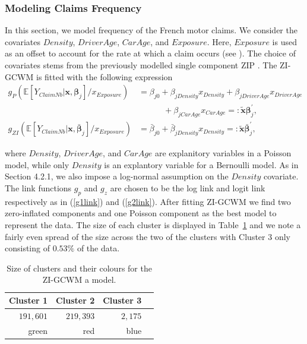 \documentclass[12pt,letterpaper]{article}
\numberwithin{equation}{section}
\numberwithin{equation}{section}
\numberwithin{equation}{section}
\newcommand{\xTilda}{\tilde{\bm{x}}}
\begin{document}
 \subsubsection{Modeling Claims Frequency}

In this section, we model frequency of the French motor claims. We consider the covariates $Density$, $DriverAge$, $CarAge$, and $Exposure$. Here, $Exposure$ is used as an offset to account for the rate at which a claim occurs (see \cite{frees2015}). The choice of covariates stems from the previously modelled single component ZIP \citep{Charpentier:2014}.
The ZI-GCWM is fitted with the following expression
\begin{align}
g_P(\mathbb{E}\left[Y_{ClaimNb}|\bm{x}, \bm{\beta}_j \right]/x_{Exposure}) & = 
  \beta_{j0} +  \beta_{jDensity}x_{Density}+ \beta_{jDriverAge}x_{DriverAge} \nonumber \\    &  \quad\quad\quad +  \beta_{jCarAge}x_{CarAge}  =: \bm{\xTilda} \bm{\beta}_j^{'},   \label{poissonReg}\\
g_{ZI}(\mathbb{E}\left[Y_{ClaimNb}|\bm{x}, \bar{\bm{\beta}}_j \right]/x_{Exposure})& = \bar{\beta}_{j0} +  \bar{\beta}_{jDensity} x_{Density} =: \bm{\xTilda} \bar{\bm{\beta}}_j^{'},  \label{zeroReg} 
\end{align}

where $Density$, $DriverAge$, and $CarAge$ are explanitory variables in a Poisson model, while only $Density$ is an explantory variable for a Bernoulli model. As in Section 4.2.1, we also impose a log-normal assumption on the $Density$ covariate. The link functions $g_p$ and $g_z$ are chosen to be the log link and logit link respectively as in (\ref{g1link}) and (\ref{g2link}).
After fitting ZI-GCWM we find two zero-inflated components and one Poisson component as the best model to represent the data. The size of each cluster is displayed in Table~\ref{table:sizeFreq} and we note a fairly even spread of the size across the two of the clusters with Cluster 3 only consisting of $0.53 \%$ of the data.
\begin{table}[!htb]
\centering
\caption{Size of clusters and their colours for the ZI-GCWM a model.}
\label{table:sizeFreq}
\begin{tabular}{rrrr}
\hline
Cluster 1   & Cluster 2  & Cluster 3   \\
\hline
$191,601$& $219,393$ & $2,175$ \\
green & red & blue  \\
\hline
\end{tabular}
\end{table}
\end{document}
